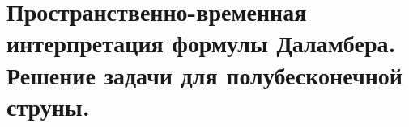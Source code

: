 \section{Пространственно-временная интерпретация формулы Даламбера. Решение
задачи для полубесконечной струны.}

\newpage
